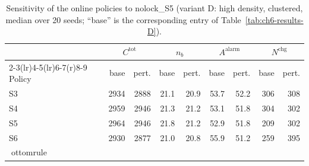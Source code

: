 \begin{table}[htbp]
\centering
\caption{Sensitivity of the online policies to nolock_S5 (variant D: high density, clustered,
median over 20 seeds; ``base'' is the corresponding entry of
Table~\ref{tab:ch6-results-D}).}
\label{tab:ch6-sens-D-nolock}
\footnotesize
\begin{tabular}{@{}l rr rr rr rr@{}}
\toprule
& \multicolumn{2}{c}{$C^{\mathrm{tot}}$} & \multicolumn{2}{c}{$n_b$}
  & \multicolumn{2}{c}{$A^{\mathrm{alarm}}$} & \multicolumn{2}{c}{$N^{\mathrm{chg}}$} \\
\cmidrule(r){2-3}\cmidrule(lr){4-5}\cmidrule(lr){6-7}\cmidrule(r){8-9}
Policy & base & pert. & base & pert. & base & pert. & base & pert. \\
\midrule

S3 & 2934 & 2888 & 21.1 & 20.9 & 53.7 & 52.2 & 306 & 308 \\
S4 & 2959 & 2946 & 21.3 & 21.2 & 53.1 & 51.8 & 304 & 302 \\
S5 & 2964 & 2946 & 21.8 & 21.2 & 52.9 & 51.8 & 209 & 302 \\
S6 & 2930 & 2877 & 21.0 & 20.8 & 55.9 & 51.2 & 259 & 395 \\
ottomrule
\end{tabular}
\end{table}
